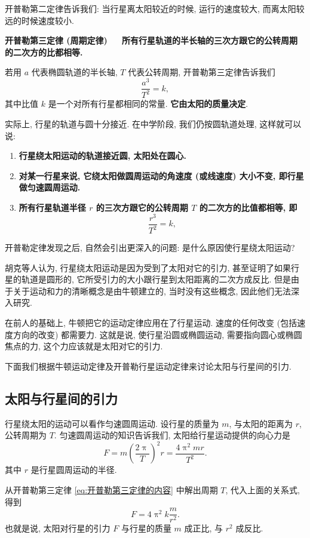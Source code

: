 \documentclass[UTF8,openany,fontset=fandol]{ctexbook}
\theoremstyle{chinesetextbook}
\newcommand{\bre}{\ \ \ }
\begin{document}
开普勒第二定律告诉我们: 当行星离太阳较近的时候, 运行的速度较大, 而离太阳较远的时候速度较小.

\textbf{开普勒第三定律 (周期定律)\bre 所有行星轨道的半长轴的三次方跟它的公转周期的二次方的比都相等.}

若用 $a$ 代表椭圆轨道的半长轴, $T$ 代表公转周期, 开普勒第三定律告诉我们
\[
\frac{a^3}{T^2}=k,
\]
其中比值 $k$ 是一个对所有行星都相同的常量. \textbf{它由太阳的质量决定}.

实际上, 行星的轨道与圆十分接近. 在中学阶段, 我们仍按圆轨道处理, 这样就可以说:
\begin{enumerate}[itemsep=0pt]
\item \textbf{行星绕太阳运动的轨道接近圆, 太阳处在圆心.}
\item \textbf{对某一行星来说, 它绕太阳做圆周运动的角速度 (或线速度) 大小不变, 即行星做匀速圆周运动.}
\item \textbf{所有行星轨道半径 $r$ 的三次方跟它的公转周期 $T$ 的二次方的比值都相等, 即}
\begin{equation}\label{eq:开普勒第三定律的内容}
\frac{r^3}{T^2}=k,
\end{equation}
\end{enumerate}

开普勒定律发现之后, 自然会引出更深入的问题: 是什么原因使行星绕太阳运动?

胡克等人认为, 行星绕太阳运动是因为受到了太阳对它的引力, 甚至证明了如果行星的轨道是圆形的, 它所受引力的大小跟行星到太阳距离的二次方成反比. 但是由于关于运动和力的清晰概念是由牛顿建立的, 当时没有这些概念, 因此他们无法深入研究.

在前人的基础上, 牛顿把它的运动定律应用在了行星运动. 速度的任何改变 (包括速度方向的改变) 都需要力. 这就是说, 使行星沿圆或椭圆运动, 需要指向圆心或椭圆焦点的力, 这个力应该就是太阳对它的引力.

下面我们根据牛顿运动定律及开普勒行星运动定律来讨论太阳与行星间的引力.
\subsection{太阳与行星间的引力}
行星绕太阳的运动可以看作匀速圆周运动. 设行星的质量为 $m$, 与太阳的距离为 $r$, 公转周期为 $T$. 匀速圆周运动的知识告诉我们, 太阳给行星运动提供的向心力是
\[
F=m\left(\frac{2\uppi}{T}\right)^2r=\frac{4\uppi^2mr}{T^2}.
\]
其中 $r$ 是行星圆周运动的半径.

从开普勒第三定律 \eqref{eq:开普勒第三定律的内容} 中解出周期 $T$, 代入上面的关系式, 得到
\[
F=4\uppi^2k\frac{m}{r^2}.
\]
也就是说, 太阳对行星的引力 $F$ 与行星的质量 $m$ 成正比, 与 $r^2$ 成反比.
\end{document}
